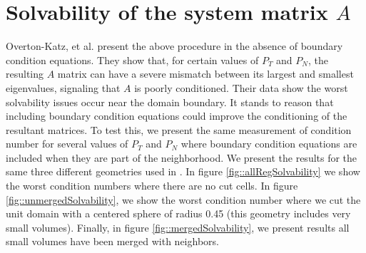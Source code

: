\documentclass{article}
\begin{document}
{ 
\section{Solvability of the system matrix $A$}

Overton-Katz, et al. \cite{Katz2023} present the above procedure in
the absence of boundary condition equations.   They show that, for
certain values of $P_T$ and $P_N$, the resulting $A$ matrix can have a
severe mismatch between its largest and smallest eigenvalues,
signaling that $A$ is poorly conditioned.    Their data show the
worst solvability issues occur near the domain boundary.    It stands to
reason that including boundary condition equations could improve the
conditioning of the resultant matrices. To test this, we present the
same measurement of condition number for  several values of $P_T$ and
$P_N$ where boundary condition equations are included when they are
part of the neighborhood.    We present the results for the same three
different geometries used in \cite{Katz2023}.  In figure \ref{fig::allRegSolvability} we show
the worst condition numbers where there are no cut cells.
In figure \ref{fig::unmergedSolvability}, we show the worst condition
number where we cut the unit domain with a centered sphere of radius
0.45 (this geometry includes very small volumes).    Finally, in
figure \ref{fig::mergedSolvability}, we present results all small
volumes have been merged with neighbors.

}
\end{document}
